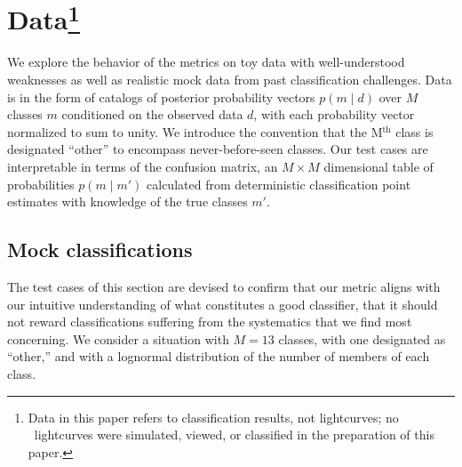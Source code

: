 \section{Data\footnote{Data in this paper refers to classification results, not lightcurves; no \plasticc\ lightcurves were simulated, viewed, or classified in the preparation of this paper.}}
\label{sec:data}


We explore the behavior of the metrics on toy data with well-understood weaknesses as well as realistic mock data from past classification challenges.
Data is in the form of catalogs of posterior probability vectors $p(m \mid d)$ over $M$ classes $m$ conditioned on the observed data $d$, with each probability vector normalized to sum to unity.
We introduce the convention that the M$^{\mathrm{th}}$ class is designated ``other'' to encompass never-before-seen classes.
Our test cases are interpretable in terms of the confusion matrix, an $M\times M$ dimensional table of probabilities $p(m \mid m')$ calculated from deterministic classification point estimates with knowledge of the true classes $m'$.

\subsection{Mock classifications}
\label{sec:mockdata}

The test cases of this section are devised to confirm that our metric aligns with our intuitive understanding of what constitutes a good classifier, that it should not reward classifications suffering from the systematics that we find most concerning.
We consider a situation with $M=13$ classes, with one designated as ``other,'' and with a lognormal distribution of the number of members of each class.

